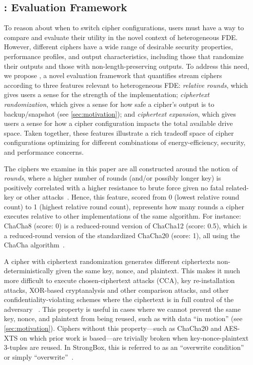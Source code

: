 \subsection{\sysC: Evaluation Framework}\label{subsec:des-trade}

To reason about when to switch cipher configurations, users must have a way to
compare and evaluate their utility in the novel context of heterogeneous FDE.
However, different ciphers have a wide range of desirable security properties,
performance profiles, and output characteristics, including those that randomize
their outputs and those with non-length-preserving outputs. To address this
need, we propose \sysC, a novel evaluation framework that quantifies stream
ciphers according to three features relevant to heterogeneous FDE: {\em relative
rounds}, which gives users a sense for the strength of the implementation;
{\em ciphertext randomization}, which gives a sense for how safe a cipher's
output is to backup/snapshot (see \cref{sec:motivation}); and {\em ciphertext
expansion}, which gives users a sense for how a cipher configuration impacts the
total available drive space. Taken together, these features illustrate a rich
tradeoff space of cipher configurations optimizing for different combinations of
energy-efficiency, security, and performance concerns.


 The ciphers we examine in this paper are all
constructed around the notion of {\em rounds}, where a higher number of rounds
(and/or possibly longer key) is positively correlated with a higher resistance
to brute force given no fatal related-key or other
attacks~\cite{ChaCha-Cryptanalysis}. Hence, this feature, scored from 0 (lowest
relative round count) to 1 (highest relative round count), represents how many
rounds a cipher executes relative to other implementations of the same
algorithm. For instance: ChaCha8 (score: 0) is a reduced-round version of
ChaCha12 (score: 0.5), which is a reduced-round version of the standardized
ChaCha20 (score: 1), all using the ChaCha
algorithm~\cite{ChaCha20,ChaCha-Cryptanalysis}.


 A cipher with ciphertext
randomization generates different ciphertexts non-deterministically given the
same key, nonce, and plaintext. This makes it much more difficult to execute
chosen-ciphertext attacks (CCA), key re-installation attacks, XOR-based
cryptanalysis and other comparison attacks, and other confidentiality-violating
schemes where the ciphertext is in full control of the adversary
~\cite{Freestyle}. This property is useful in cases where we cannot prevent the
same key, nonce, and plaintext from being reused, such as with data ``in
motion'' (see \cref{sec:motivation}). Ciphers without this property---such as
ChaCha20 and AES-XTS on which prior work is based---are trivially broken when
key-nonce-plaintext 3-tuples are reused. In StrongBox, this is referred to as an
``overwrite condition'' or simply ``overwrite''~\cite{StrongBox}.

